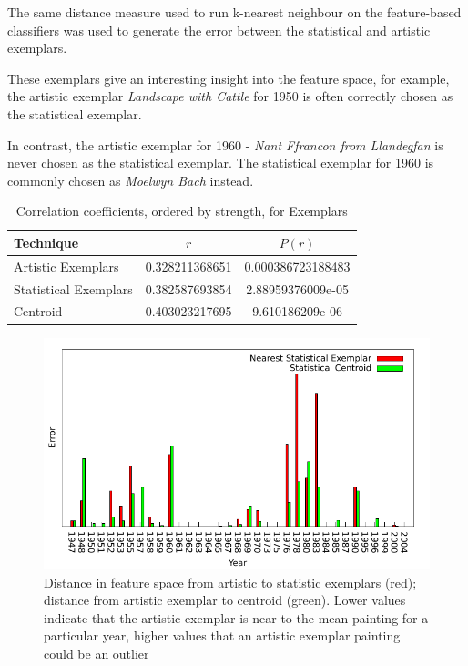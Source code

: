 \documentclass[conference,a4paper]{IEEEtran}
\begin{document}
The same distance measure used to run k-nearest neighbour on the feature-based classifiers was
used to generate the error between the statistical and artistic exemplars.



These exemplars give an interesting insight into the feature space, for example,
the artistic exemplar \emph{Landscape with Cattle} for 1950 is often correctly 
chosen as the statistical exemplar.

In contrast, the artistic exemplar for 1960 - \emph{Nant Ffrancon from Llandegfan}
is never chosen as the statistical exemplar. The statistical exemplar for 1960 is 
commonly chosen as \emph{Moelwyn Bach} instead.

\begin{table}[h]
\centering
\begin{tabular}{|p{3.5cm}|c|c|}
\hline
Technique     & $r$ & $P(r)$ \\ \hline
Artistic Exemplars	& 0.328211368651	& 0.000386723188483\\
Statistical Exemplars	& 0.382587693854	& 2.88959376009e-05 \\
Centroid		& 0.403023217695	& 9.610186209e-06\\
\hline
\end{tabular}
\caption{Correlation coefficients, ordered by strength, for Exemplars}
\end{table}

\begin{figure}[h]
\includegraphics[width=\linewidth]{img/exemplar.pdf}
\caption{Distance in feature space from artistic to statistic exemplars (red); distance from
artistic exemplar to centroid (green). Lower values indicate that the artistic
exemplar is near to the mean painting for a particular year, higher values that an
artistic exemplar painting could be an outlier}
\end{figure}
\end{document}
